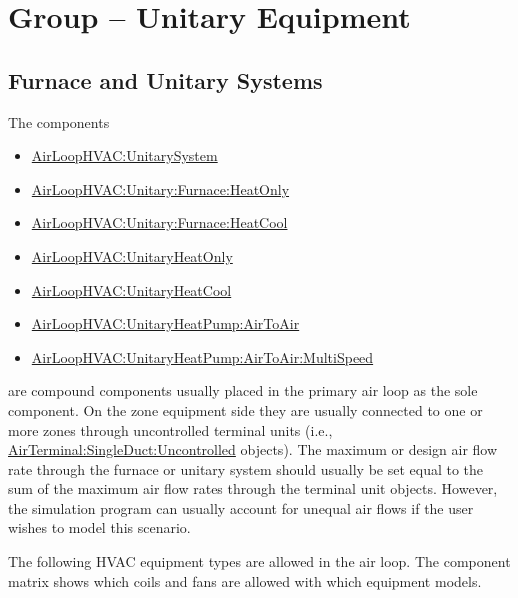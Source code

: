 \section{Group -- Unitary Equipment}\label{group-unitary-equipment}

\subsection{Furnace and Unitary Systems}\label{furnace-and-unitary-systems}

The components

\begin{itemize}
\item
  \hyperref[airloophvacunitarysystem]{AirLoopHVAC:UnitarySystem}
\item
  \hyperref[airloophvacunitaryfurnaceheatonly]{AirLoopHVAC:Unitary:Furnace:HeatOnly}
\item
  \hyperref[airloophvacunitaryfurnaceheatcool]{AirLoopHVAC:Unitary:Furnace:HeatCool}
\item
  \hyperref[airloophvacunitaryheatonly]{AirLoopHVAC:UnitaryHeatOnly}
\item
  \hyperref[airloophvacunitaryheatcool]{AirLoopHVAC:UnitaryHeatCool}
\item
  \hyperref[airloophvacunitaryheatpumpairtoair]{AirLoopHVAC:UnitaryHeatPump:AirToAir}
\item
  \hyperref[airloophvacunitaryheatpumpairtoairmultispeed]{AirLoopHVAC:UnitaryHeatPump:AirToAir:MultiSpeed}
\end{itemize}

are compound components usually placed in the primary air loop as the sole component. On the zone equipment side they are usually connected to one or more zones through uncontrolled terminal units (i.e., \hyperref[airterminalsingleductuncontrolled]{AirTerminal:SingleDuct:Uncontrolled} objects). The maximum or design air flow rate through the furnace or unitary system should usually be set equal to the sum of the maximum air flow rates through the terminal unit objects. However, the simulation program can usually account for unequal air flows if the user wishes to model this scenario.

The following HVAC equipment types are allowed in the air loop. The component matrix shows which coils and fans are allowed with which equipment models.

